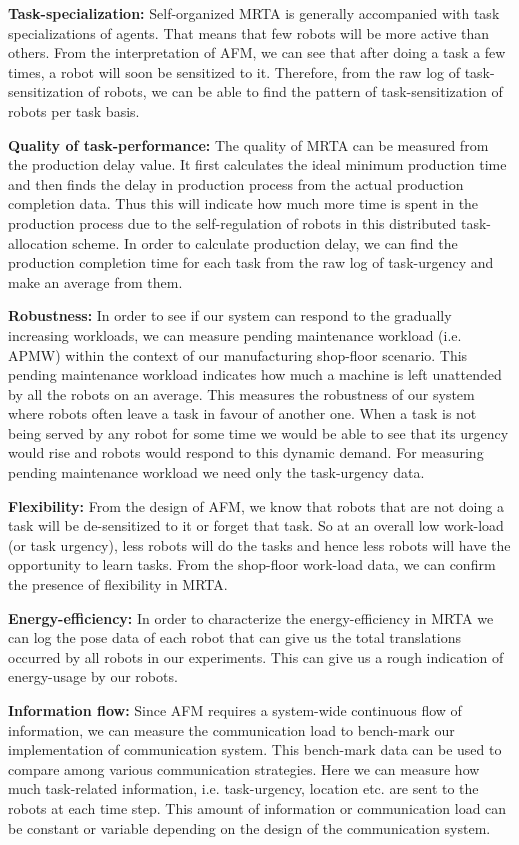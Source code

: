 \documentclass[smallcondensed]{svjour3}
\begin{document}
\textbf{Task-specialization:} Self-organized MRTA is generally accompanied with task specializations of agents. That means that few robots will be more active than others. From the interpretation of AFM, we can see that after doing a task a few times, a robot will soon be sensitized to it. Therefore, from the raw log of task-sensitization of robots, we can be able to find the pattern of task-sensitization of robots per task basis.

\textbf{Quality of task-performance:} The quality of MRTA can be measured from the production delay value. It first calculates the ideal minimum production time and then finds the delay in production process from the actual production completion data. Thus this will indicate how much more time is  spent in the production process due to the self-regulation of robots in this distributed task-allocation scheme.  In order to calculate production delay, we can find the production completion time for each task from the raw log of task-urgency and make an average from them.

\textbf{Robustness:} In order to see if our system can respond to the gradually increasing workloads,  we can measure pending maintenance workload (i.e. APMW) within the context of our manufacturing shop-floor scenario. This pending maintenance workload indicates how much a machine is left unattended by all the robots on an average. This measures the robustness of our system where robots often leave a task in favour of another one. When a task is not being served by any robot for some time we would be able to see that its urgency would rise and robots would respond to this dynamic demand. For measuring pending maintenance workload we need only the task-urgency data.

\textbf{Flexibility:} From the design of AFM, we know that robots that are not doing a task will be de-sensitized to it or forget that task. So at an overall low work-load (or task urgency), less robots will do the tasks and hence less robots will have the opportunity to learn tasks. From the shop-floor work-load data, we can confirm the presence of flexibility in MRTA.

\textbf{Energy-efficiency:} In order to characterize the energy-efficiency in MRTA we can log the pose data of each robot that can give us the total translations occurred by all robots in our experiments. This can give us a rough indication of energy-usage by our robots. 

\textbf{Information flow:} Since AFM requires a system-wide continuous flow of information, we can measure the communication load to bench-mark our implementation of communication system. This bench-mark data can be used to compare among various communication strategies. Here we can measure  how much task-related information, i.e. task-urgency, location etc. are sent to the robots at each time step. This  amount of information or communication load can be constant or variable depending on the design of the communication system.
\end{document}
